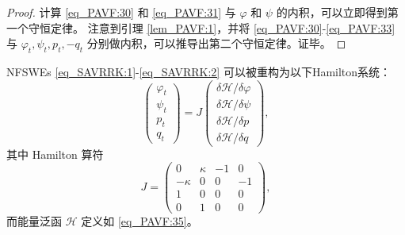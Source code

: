 \begin{proof}
计算 \eqref{eq_PAVF:30} 和 \eqref{eq_PAVF:31} 与 $\varphi$ 和 $\psi$ 的内积，可以立即得到第一个守恒定律。
注意到引理 \ref{lem_PAVF:1}，并将 \eqref{eq_PAVF:30}-\eqref{eq_PAVF:33} 与 $\varphi_{t}, \psi_{t}, p_{t},-q_{t}$ 分别做内积，可以推导出第二个守恒定律。证毕。
\end{proof}

\begin{theorem}\label{thm_PAVF:2}
	NFSWEs \eqref{eq_SAVRRK:1}-\eqref{eq_SAVRRK:2} 可以被重构为以下Hamilton系统：
\begin{equation}\label{eq_PAVF:37}
	\left(\begin{array}{l}
		\varphi_{t} \\
		\psi_{t} \\
		p_{t} \\
		q_{t}
		\end{array}\right)=J\left(\begin{array}{l}
		\delta \mathcal{H} / \delta \varphi \\
		\delta \mathcal{H} / \delta \psi \\
		\delta \mathcal{H} / \delta p \\
		\delta \mathcal{H} / \delta q
		\end{array}\right),
\end{equation}
其中 Hamilton 算符
\begin{equation}\label{eq_PAVF:37b}
J=\left(\begin{array}{cccc}
		0 & \kappa & -1 & 0 \\
		-\kappa & 0 & 0 & -1 \\
		1 & 0 & 0 & 0 \\
		0 & 1 & 0 & 0
		\end{array}\right),
\end{equation}
而能量泛函 $\mathcal{H}$ 定义如 \eqref{eq_PAVF:35}。
\end{theorem}

